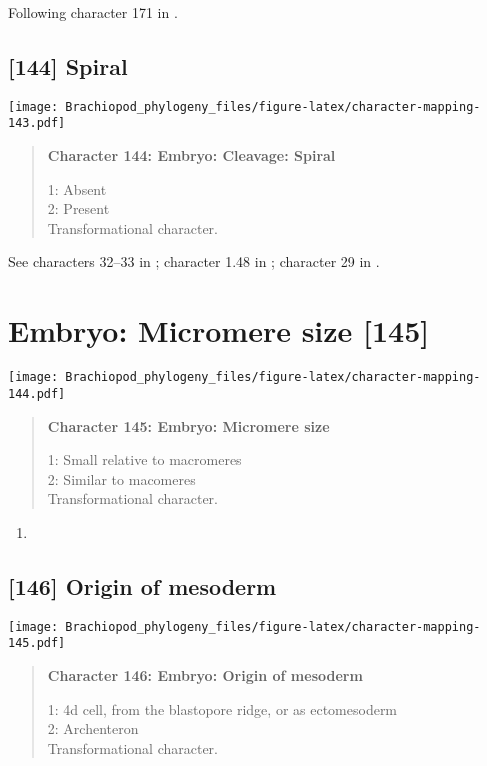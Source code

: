 \documentclass[openany]{book}
\theoremstyle{definition}
\theoremstyle{definition}
\theoremstyle{definition}
\theoremstyle{remark}
\begin{document}
Following character 171 in \citet{Giribet2002}.

\subsection*{{[}144{]} Spiral}\label{spiral}

\texttt{[image: Brachiopod\_phylogeny\_files/figure-latex/character-mapping-143.pdf]}

\begin{quote}
\textbf{Character 144: Embryo: Cleavage: Spiral}

1: Absent\\
2: Present\\
Transformational character.
\end{quote}

See characters 32--33 in \citet{Haszprunar1996}; character 1.48 in
\citet{SPS1996}; character 29 in \citet{Glenner2004}.

\section{Embryo: Micromere size
{[}145{]}}\label{embryo-micromere-size-145}

\texttt{[image: Brachiopod\_phylogeny\_files/figure-latex/character-mapping-144.pdf]}

\begin{quote}
\textbf{Character 145: Embryo: Micromere size}

1: Small relative to macromeres\\
2: Similar to macomeres\\
Transformational character.
\end{quote}

\begin{enumerate}
\def\labelenumi{\arabic{enumi}.}
\item
\end{enumerate}

\subsection*{{[}146{]} Origin of mesoderm}\label{origin-of-mesoderm}

\texttt{[image: Brachiopod\_phylogeny\_files/figure-latex/character-mapping-145.pdf]}

\begin{quote}
\textbf{Character 146: Embryo: Origin of mesoderm}

1: 4d cell, from the blastopore ridge, or as ectomesoderm\\
2: Archenteron\\
Transformational character.
\end{quote}
\end{document}
